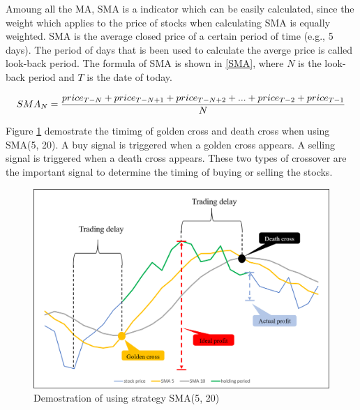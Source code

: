 \documentclass[../main.tex]{subfiles}
\begin{document}
Amoung all the MA, SMA is a indicator which can be easily calculated, since the weight which applies to the price of stocks when calculating SMA is equally weighted. SMA is the average closed price of a certain period of time (e.g., 5 days). The period of days that is been used to calculate the averge price is called look-back period. The formula of SMA is shown in \ref{SMA}, where $N$ is the look-back period and $T$ is the date of today.

\begin{equation}\label{SMA}\scalebox{1}
    {$SMA_{N} = \dfrac{price_{T-N}+price_{T-N+1}+price_{T-N+2}+...+price_{T-2}+price_{T-1}}{N}$}
\end{equation}
\bigbreak

\bigbreak
Figure \ref{cross_demo} demostrate the timimg of golden cross and death cross when using SMA(5, 20). A buy signal is triggered when a golden cross appears. A selling signal is triggered when a death cross appears. These two types of crossover are the important signal to determine the timing of buying or selling the stocks.
\bigbreak


\begin{figure}
    \centering
    \includegraphics[scale = 0.6] {figure/cross1.png}
    \caption{Demostration of using strategy SMA(5, 20)}
    \label{cross_demo}
\end{figure}
\end{document}
